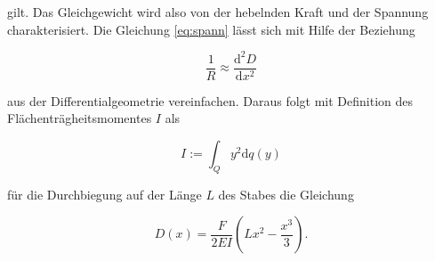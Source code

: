 \documentclass[
  bibliography=totoc,     %
  captions=tableheading,  %
  titlepage=firstiscover, %
]{scrartcl}
\begin{document}
gilt. Das Gleichgewicht wird also von der hebelnden Kraft und der Spannung
charakterisiert. Die Gleichung \ref{eq:spann} lässt sich mit Hilfe der
Beziehung

\begin{equation}
	\frac{1}{R}\approx\frac{\mathup{d}^2D}{\mathup{d}x^2}
	\label{eq:approx}
\end{equation}

aus der Differentialgeometrie vereinfachen. Daraus folgt mit Definition des
Flächenträgheitsmomentes $I$ als

\begin{equation}
	I:=\int_Q y^2 \mathup{d}q(y)
	\label{eq:trägheit}
\end{equation}

für die Durchbiegung auf der Länge $L$ des Stabes die Gleichung

\begin{equation}
	D(x)=\frac{F}{2EI}\left(Lx^2-\frac{x^3}{3}\right)\text{.}
	\label{eq:durchbieg}
\end{equation}
\end{document}
